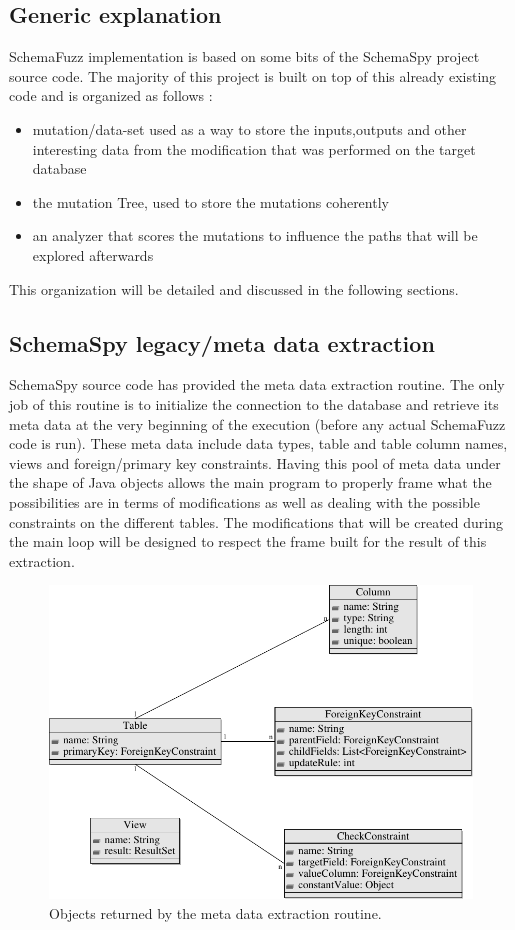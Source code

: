 \documentclass{article}
\begin{document}
\begin{empfile}
		\subsection{Generic explanation}
SchemaFuzz implementation is based on some bits of the SchemaSpy project source code.
The majority of this project is built on top of this already existing code and is organized as follows :
		\begin{itemize}
		\item{mutation/data-set used as a way to store the inputs,outputs and other interesting data from the modification that was performed on the target database}
		\item{the mutation Tree, used to store the mutations coherently}
		\item{an analyzer that scores the mutations to influence the paths that will be explored afterwards}
		\end{itemize}
		 
This organization will be detailed and discussed in the following sections.
		\subsection{SchemaSpy legacy/meta data extraction}
SchemaSpy source code has provided the meta data extraction routine. The only job of this routine is to initialize the connection to the database and retrieve its meta data at the very beginning of the execution (before any actual SchemaFuzz code is run). These meta data include data types, table and table column names, views and foreign/primary key constraints. Having this pool of meta data under the shape of Java objects allows the main program to properly frame what the possibilities are in terms of modifications as well as dealing with the possible constraints on the different tables. The modifications that will be created during the main loop will be designed to respect the frame built for the result of this extraction.

\clearpage

\begin{figure} [h!]
\centering
\includegraphics[width=\textwidth]{MetaDataExtractionDiagram-1.pdf}
\caption{Objects returned by the meta data extraction routine.}
\end{figure}


\end{empfile}
\end{document}
